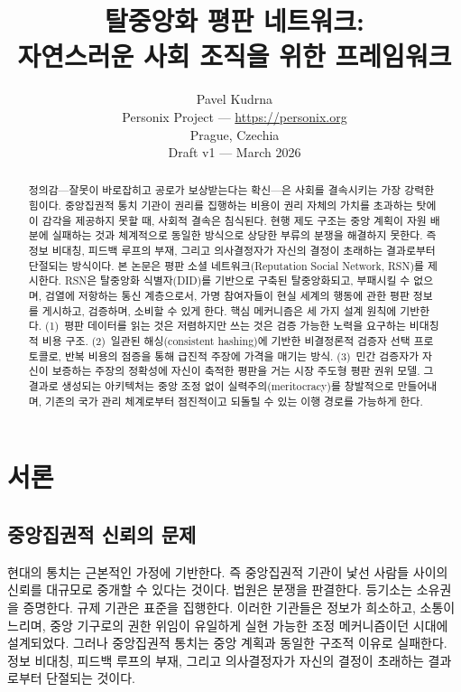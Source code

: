 \documentclass[11pt,a4paper,twocolumn]{article}
\title{\textbf{탈중앙화 평판 네트워크:\\자연스러운 사회 조직을 위한 프레임워크}}
\author{Pavel Kudrna\\Personix Project --- \url{https://personix.org}\\Prague, Czechia\\Draft v1 --- March 2026}
\date{}
\begin{document}
\maketitle

\begin{abstract}
정의감---잘못이 바로잡히고 공로가 보상받는다는 확신---은 사회를 결속시키는 가장 강력한 힘이다. 중앙집권적 통치 기관이 권리를 집행하는 비용이 권리 자체의 가치를 초과하는 탓에 이 감각을 제공하지 못할 때, 사회적 결속은 침식된다. 현행 제도 구조는 중앙 계획이 자원 배분에 실패하는 것과 체계적으로 동일한 방식으로 상당한 부류의 분쟁을 해결하지 못한다. 즉 정보 비대칭, 피드백 루프의 부재, 그리고 의사결정자가 자신의 결정이 초래하는 결과로부터 단절되는 방식이다. 본 논문은 평판 소셜 네트워크(Reputation Social Network, RSN)를 제시한다. RSN은 탈중앙화 식별자(DID)를 기반으로 구축된 탈중앙화되고, 부패시킬 수 없으며, 검열에 저항하는 통신 계층으로서, 가명 참여자들이 현실 세계의 행동에 관한 평판 정보를 게시하고, 검증하며, 소비할 수 있게 한다. 핵심 메커니즘은 세 가지 설계 원칙에 기반한다. (1)~평판 데이터를 읽는 것은 저렴하지만 쓰는 것은 검증 가능한 노력을 요구하는 비대칭적 비용 구조. (2)~일관된 해싱(consistent hashing)에 기반한 비결정론적 검증자 선택 프로토콜로, 반복 비용의 점증을 통해 급진적 주장에 가격을 매기는 방식. (3)~민간 검증자가 자신이 보증하는 주장의 정확성에 자신이 축적한 평판을 거는 시장 주도형 평판 권위 모델. 그 결과로 생성되는 아키텍처는 중앙 조정 없이 실력주의(meritocracy)를 창발적으로 만들어내며, 기존의 국가 관리 체계로부터 점진적이고 되돌릴 수 있는 이행 경로를 가능하게 한다.
\end{abstract}

\section{서론}

\subsection{중앙집권적 신뢰의 문제}

현대의 통치는 근본적인 가정에 기반한다. 즉 중앙집권적 기관이 낯선 사람들 사이의 신뢰를 대규모로 중개할 수 있다는 것이다. 법원은 분쟁을 판결한다. 등기소는 소유권을 증명한다. 규제 기관은 표준을 집행한다. 이러한 기관들은 정보가 희소하고, 소통이 느리며, 중앙 기구로의 권한 위임이 유일하게 실현 가능한 조정 메커니즘이던 시대에 설계되었다. 그러나 중앙집권적 통치는 중앙 계획과 동일한 구조적 이유로 실패한다. 정보 비대칭, 피드백 루프의 부재, 그리고 의사결정자가 자신의 결정이 초래하는 결과로부터 단절되는 것이다.
\end{document}

